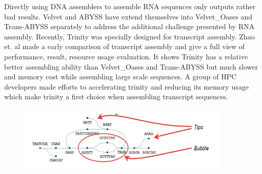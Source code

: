 \documentclass{article}
\begin{document}
Directly using DNA assemblers to assemble RNA sequences only outputs rather bad results. Velvet and ABYSS have extend themselves into Velvet\_Oases \cite{schulz2012oases} and Trans-ABYSS \cite{robertson2010novo} separately to address the additional challenge presented by RNA assembly. Recently, Trinity \cite{grabherr2011full} was specially designed for transcript assembly. Zhao et. al \cite{zhao2011optimizing} made a early comparison of transcript assembly and give a full view of performance, result, resource usage evaluation. It shows Trinity has a relative better assembling ability than Velvet\_Oases and Trans-ABYSS but much slower and memory cost while assembling large scale sequences. A group of HPC developers \cite{henschel2012trinity} made efforts to accelerating trinity and reducing its memory usage which make trinity a first choice when assembling transcript sequences.
\begin{figure}[ht]
  \centering
  \includegraphics[width=10cm]{Figure7.jpg}\\
  \caption{}\label{branch_example}
\end{figure}
\end{document}
